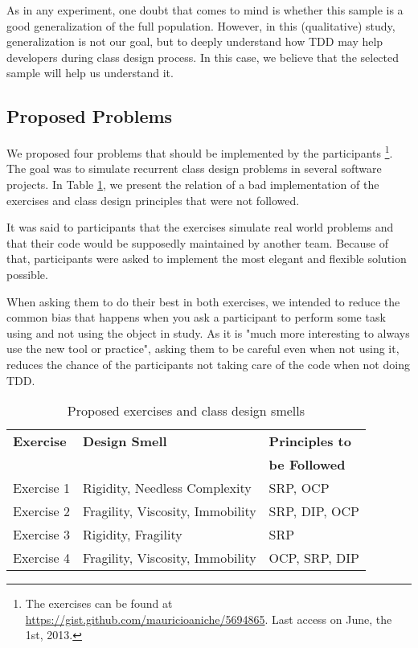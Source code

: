 \documentclass[times]{elsarticle}
\begin{document}
As in any experiment, one doubt that comes to mind is whether this sample is a good
generalization of the full population. However, in this (qualitative) study, generalization
is not our goal, but to deeply understand how TDD may help developers
during class design process. In this case, we believe that the selected sample will
help us understand it.

\subsection{Proposed Problems}
\label{sec:exercicios}

We proposed four problems that should be implemented by the participants
\footnote{The exercises can be found at \url{https://gist.github.com/mauricioaniche/5694865}. Last access on June, the 1st, 2013.}. 
The goal was to simulate recurrent class design problems in several software projects.
In Table \ref{tab:problemas-exercicios}, we present the relation of a bad implementation of
the exercises and class design principles that were not followed.

It was said to participants that the exercises simulate real world problems and that their code
would be supposedly maintained by another team. Because of that, participants were asked to
implement the most elegant and flexible solution possible. 


When asking them to do their best in both
exercises, we intended to reduce the common bias that happens when you ask a participant to perform some task
using and not using the object in study. As it is "much more interesting to always use the new tool or practice",
asking them to be careful even when not using it, reduces the chance of the participants not taking care of
the code when not doing TDD.

\begin{table}
	\centering
	\begin{tabular}{| p{2cm} | p{5cm} | p{2.5cm} | }
		\hline
		\textbf{Exercise} & \textbf{Design Smell} & \textbf{Principles to}\\
		& & \textbf{be Followed}\\
		
		\hline
		
		Exercise 1 & Rigidity, Needless Complexity & SRP, OCP \\ \hline
		Exercise 2 & Fragility, Viscosity, Immobility & SRP, DIP, OCP \\ \hline
		Exercise 3 & Rigidity, Fragility & SRP\\
		Exercise 4 & Fragility, Viscosity, Immobility & OCP, SRP, DIP \\ \hline
		
		\hline
	\end{tabular}
	\caption{Proposed exercises and class design smells}
	\label{tab:problemas-exercicios}
\end{table}
\end{document}
